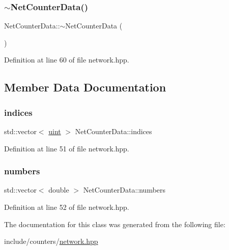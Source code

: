 \mbox{\label{class_net_counter_data_a2e88fcc7f0296d791fe9f0facd24489f}} 
\subsubsection{\texorpdfstring{$\sim$\+Net\+Counter\+Data()}{~NetCounterData()}}
{\footnotesize\ttfamily Net\+Counter\+Data\+::$\sim$\+Net\+Counter\+Data (\begin{DoxyParamCaption}{ }\end{DoxyParamCaption})\hspace{0.3cm}{\ttfamily [inline]}}



Definition at line 60 of file network.\+hpp.



\subsection{Member Data Documentation}
\mbox{\label{class_net_counter_data_ae2f47af99f3fa785d3faac089ab90d83}} 
\subsubsection{\texorpdfstring{indices}{indices}}
{\footnotesize\ttfamily std\+::vector$<$ \hyperlink{typedefs_8hpp_a91ad9478d81a7aaf2593e8d9c3d06a14}{uint} $>$ Net\+Counter\+Data\+::indices}



Definition at line 51 of file network.\+hpp.

\mbox{\label{class_net_counter_data_ad218e01cd14fb4abfbe21d8d92a6cbd3}} 
\subsubsection{\texorpdfstring{numbers}{numbers}}
{\footnotesize\ttfamily std\+::vector$<$ double $>$ Net\+Counter\+Data\+::numbers}



Definition at line 52 of file network.\+hpp.



The documentation for this class was generated from the following file\+:\begin{DoxyCompactItemize}
\item 
include/counters/\hyperlink{network_8hpp}{network.\+hpp}\end{DoxyCompactItemize}
